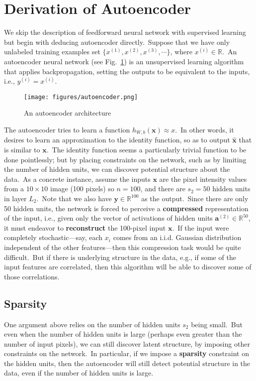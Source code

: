 \section{Derivation of Autoencoder}
We skip the description of feedforward neural network with supervised learning but begin with deducing autoencoder directly.~Suppose that we have only unlabeled training examples set $\{x^{(1)},x^{(2)},x^{(3)},\cdots\}$, where $x^{(i)} \in \mathbb{R}$.~An autoencoder neural network (see Fig.~\ref{fig:autoencoder}) is an unsupervised learning algorithm that applies backpropagation, setting the outputs to be equivalent to the inputs, i.e., $y^{(i)}=x^{(i)}$.
\begin{figure}[htbp]
	\centering
	\texttt{[image: figures/autoencoder.png]}
	\caption{An autoencoder architecture} \label{fig:autoencoder}
\end{figure}

The autoencoder tries to learn a function $h_{W,b} (\bm{x}) \approx x$.~In other words, it desires to learn an approximation to the identity function, so as to output $\hat{\bm{x}}$ that is similar to $\bm{x}$.~The identity function seems a particularly trivial function to be done pointlessly; but by placing constraints on the network, such as by limiting the number of hidden units, we can discover potential structure about the data.~As a concrete instance, assume the inputs $\bm{x}$ are the pixel intensity values from a $10 \times 10$ image (100 pixels) so $n=100$, and there are $s_2=50$ hidden units in layer $L_2$.~Note that we also have $\bm{y} \in \mathbb{R}^{100}$ as the output.~Since there are only 50 hidden units, the network is forced to perceive a \textbf{compressed} representation of the input, i.e., given only the vector of activations of hidden units $\bm{a}^{(2)} \in \mathbb{R}^{50}$, it must endeavor to \textbf{reconstruct} the 100-pixel input $\bm{x}$.~If the input were completely stochastic---say, each $x_i$ comes from an i.i.d. Gaussian distribution independent of the other features---then this compression task would be quite difficult.~But if there is underlying structure in the data, e.g., if some of the input features are correlated, then this algorithm will be able to discover some of those correlations.

\subsection{Sparsity}
One argument above relies on the number of hidden units $s_2$ being small.~But even when the number of hidden units is large (perhaps even greater than the number of input pixels), we can still discover latent structure, by imposing other constraints on the network.~In particular, if we impose a \textbf{sparsity} constraint on the hidden units, then the autoencoder will still detect potential structure in the data, even if the number of hidden units is large.

